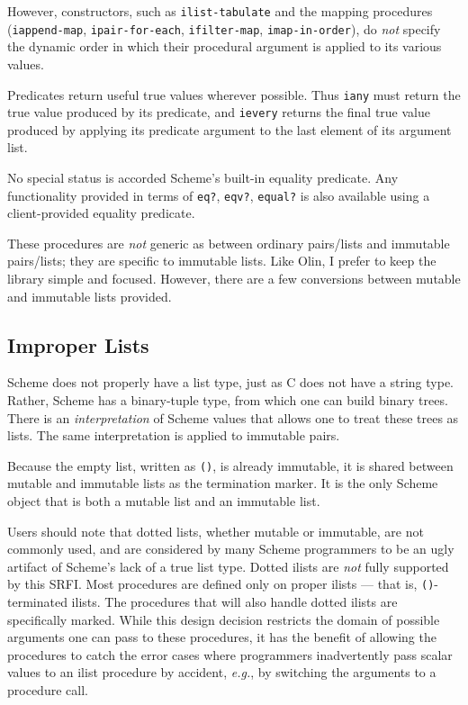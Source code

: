 However, constructors, such as \texttt{ilist-tabulate} and the mapping
procedures (\texttt{iappend-map}, \texttt{ipair-for-each},
\texttt{ifilter-map}, \texttt{imap-in-order}), do \emph{not} specify the
dynamic order in which their procedural argument is applied to its
various values.

Predicates return useful true values wherever possible. Thus
\texttt{iany} must return the true value produced by its predicate, and
\texttt{ievery} returns the final true value produced by applying its
predicate argument to the last element of its argument list.

No special status is accorded Scheme's built-in equality predicate. Any
functionality provided in terms of \texttt{eq?}, \texttt{eqv?},
\texttt{equal?} is also available using a client-provided equality
predicate.

These procedures are \emph{not} generic as between ordinary pairs/lists
and immutable pairs/lists; they are specific to immutable lists. Like
Olin, I prefer to keep the library simple and focused. However, there
are a few conversions between mutable and immutable lists provided.

\subsection{{Improper Lists}}\label{improper-lists}

Scheme does not properly have a list type, just as C does not have a
string type. Rather, Scheme has a binary-tuple type, from which one can
build binary trees. There is an \emph{interpretation} of Scheme values
that allows one to treat these trees as lists. The same interpretation
is applied to immutable pairs.

Because the empty list, written as \texttt{()}, is already immutable, it
is shared between mutable and immutable lists as the termination marker.
It is the only Scheme object that is both a mutable list and an
immutable list.

Users should note that dotted lists, whether mutable or immutable, are
not commonly used, and are considered by many Scheme programmers to be
an ugly artifact of Scheme's lack of a true list type. Dotted ilists are
\emph{not} fully supported by this SRFI. Most procedures are defined
only on proper ilists --- that is, \texttt{()}-terminated ilists. The
procedures that will also handle dotted ilists are specifically marked.
While this design decision restricts the domain of possible arguments
one can pass to these procedures, it has the benefit of allowing the
procedures to catch the error cases where programmers inadvertently pass
scalar values to an ilist procedure by accident, \emph{e.g.}, by
switching the arguments to a procedure call.
